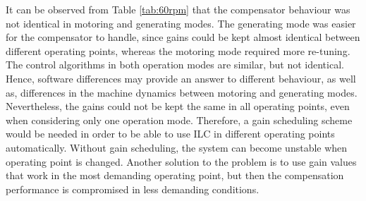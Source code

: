 
It can be observed from Table \ref{tab:60rpm} that the compensator behaviour was not identical in motoring and generating modes. The generating mode was easier for the compensator to handle, since gains could be kept almost identical between different operating points, whereas the motoring mode required more re-tuning. The control algorithms in both operation modes are similar, but not identical. Hence, software differences may provide an answer to different behaviour, as well as, differences in the machine dynamics between motoring and generating modes. Nevertheless, the gains could not be kept the same in all operating points, even when considering only one operation mode. Therefore, a gain scheduling scheme would be needed in order to be able to use ILC in different operating points automatically. Without gain scheduling, the system can become unstable when operating point is changed. Another solution to the problem is to use gain values that work in the most demanding operating point, but then the compensation performance is compromised in less demanding conditions.



